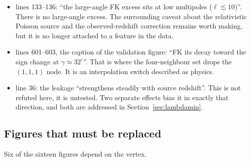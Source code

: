 \begin{itemize}
\item {} lines 133--136: ``the large-angle FK excess
sits at low multipoles ($\ell\lesssim10$)''. There is no large-angle
excess. The surrounding caveat about the relativistic Poisson source and
the observed-redshift correction remains worth making, but it is no longer
attached to a feature in the data.

\item {} lines 601--603, the caption of the validation
figure: ``FK its decay toward the sign change at $\gamma\simeq32^\circ$''.
That is where the four-neighbour set drops the $(1,1,1)$ node. It is an
interpolation switch described as physics.

\item {} line 36: the leakage ``strengthens steadily
with source redshift''. This is not refuted here, it is untested. Two
separate effects bias it in exactly that direction, and both are addressed
in Section~\ref{sec:lambdamin}.
\end{itemize}

\subsection{Figures that must be replaced}

Six of the sixteen figures depend on the vertex.

